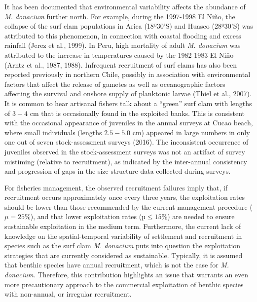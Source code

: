 \documentclass[12pt]{article}
\begin{document}
It has been documented that environmental variability affects the
abundance of \emph{M. donacium} further north. For example, during the
1997-1998 El Niño, the collapse of the surf clam populations in Arica
(18º30'S) and Huasco (28º30'S) was attributed to this phenomenon, in
connection with coastal flooding and excess rainfall (Jerez et al.,
1999). In Peru, high mortality of adult \emph{M. donacium} was
attributed to the increase in temperatures caused by the 1982-1983 El
Niño (Arntz et al., 1987, 1988). Infrequent recruitment of surf clams
has also been reported previously in northern Chile, possibly in
association with environmental factors that affect the release of
gametes as well as oceanographic factors affecting the survival and
onshore supply of planktonic larvae (Thiel et al., 2007). It is common
to hear artisanal fishers talk about a ``green'' surf clam with lengths
of \(3-4\) cm that is occasionally found in the exploited banks. This is
consistent with the occasional appearance of juveniles in the annual
surveys at Cucao beach, where small individuals (lengths \(2.5-5.0\) cm)
appeared in large numbers in only one out of seven stock-assessment
surveys (2016). The inconsistent occurrence of juveniles observed in the
stock-assessment surveys was not an artifact of survey mistiming
(relative to recruitment), as indicated by the inter-annual consistency
and progression of gaps in the size-structure data collected during
surveys.

For fisheries management, the observed recruitment failures imply that,
if recruitment occurs approximately once every three years, the
exploitation rates should be lower than those recommended by the current
management procedure (\(\mu= 25\)\%), and that lower exploitation rates
(\(µ \leq 15\)\%) are needed to ensure sustainable exploitation in the
medium term. Furthermore, the current lack of knowledge on the
spatial-temporal variability of settlement and recruitment in species
such as the surf clam \emph{M. donacium} puts into question the
exploitation strategies that are currently considered as sustainable.
Typically, it is assumed that benthic species have annual recruitment,
which is not the case for \emph{M. donacium}. Therefore, this
contribution highlights an issue that warrants an even more
precautionary approach to the commercial exploitation of benthic species
with non-annual, or irregular recruitment.
\end{document}
